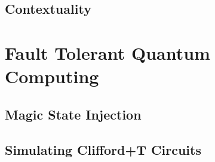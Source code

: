 \documentclass{standalone}
\begin{document}
\subsection{Contextuality}\label{sec:context}

\section{Fault Tolerant Quantum Computing}\label{sec:FTQC}

\subsection{Magic State Injection}\label{sec:MSI}

\subsection{Simulating Clifford+T Circuits}\label{sec:CHP}

\ifstandalone

\fi
\end{document}

